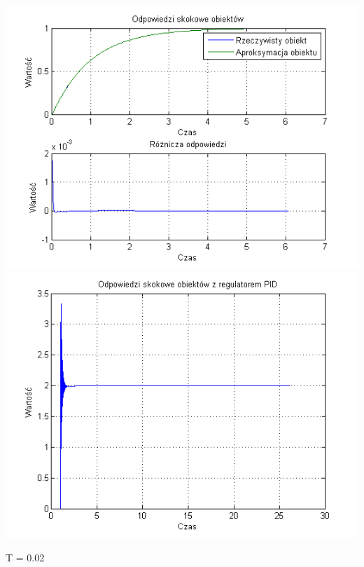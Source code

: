 \documentclass[10pt,a4paper]{article}
\begin{document}
\begin{center}
\includegraphics[scale=1]{images/dwa/skrypt_87.png}\\
\includegraphics[scale=1]{images/dwa/skrypt_88.png}\\
\end{center}
\newpage
T = 0.02
\end{document}
